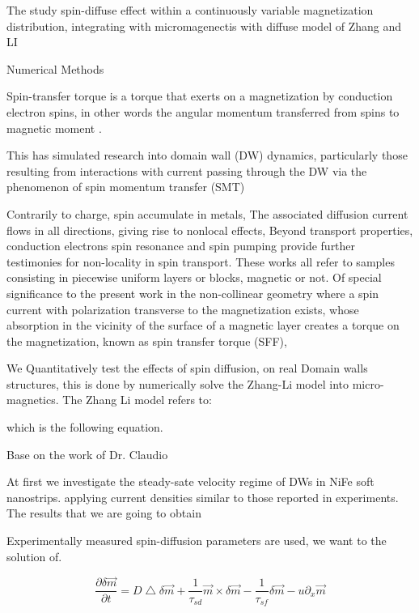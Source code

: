 The study spin-diffuse effect within a continuously variable magnetization distribution, integrating with micromagenectis with diffuse model of Zhang and LI \cite{claudio}

Numerical Methods
\cite{methods}


Spin-transfer torque is a torque that exerts on a magnetization by conduction electron spins, in other words the angular momentum transferred from spins to magnetic  moment \cite{zhang}.

This has simulated research into domain wall (DW) dynamics, particularly those resulting from interactions with current passing through the DW via the phenomenon of spin momentum transfer (SMT) \cite{handbookspin}





Contrarily to charge, spin accumulate in metals, The associated diffusion current flows in all directions, giving rise to nonlocal effects, Beyond transport properties, conduction electrons spin resonance and spin pumping provide further testimonies for non-locality in spin transport. These works all refer  to samples consisting in piecewise uniform layers or blocks, magnetic or not. Of special significance to the present work in the non-collinear geometry where a spin current with polarization transverse to the magnetization exists, whose absorption in the vicinity of the surface of a magnetic layer creates a torque on the magnetization, known as spin transfer torque (SFF), 



We Quantitatively test the effects of spin diffusion, on real Domain walls structures, this is done by numerically solve the Zhang-Li model \cite{zhang} into micro-magnetics.
The Zhang Li model refers to:

which is the following equation.

Base on the work of Dr. Claudio \cite{claudio}

At first we investigate the steady-sate velocity regime of DWs in NiFe soft nanostrips. applying current densities similar to those reported in experiments. The results that we are going to obtain 

Experimentally measured spin-diffusion parameters are used, we want to the solution of. 

\begin{equation}
 \frac{\partial \delta \vec{m} }{\partial t} =  D\bigtriangleup \delta \vec{m} + \frac{1}{\tau_{sd}} \vec{m} \times \delta  \vec{m} - \frac{1}{\tau_{sf}}\delta \vec{m} - u \partial_{x}  \vec{m}
\end{equation}


